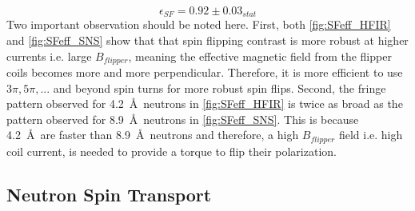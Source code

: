 \begin{equation}
    \epsilon_{SF} = 0.92 \pm 0.03_{stat}
\end{equation}
Two important observation should be noted here. First, both \cref{fig:SFeff_HFIR} and \cref{fig:SFeff_SNS} show that that spin flipping contrast is more robust at higher currents i.e. large $B_{flipper}$, meaning the effective magnetic field from the flipper coils becomes more and more perpendicular. Therefore, it is more efficient to use $3\pi, 5\pi, ...$ and beyond spin turns for more robust spin flips. Second, the fringe pattern observed for 4.2~\AA\ neutrons in \cref{fig:SFeff_HFIR} is twice as broad as the pattern observed for 8.9~\AA\ neutrons in \cref{fig:SFeff_SNS}. This is because 4.2~\AA\ are faster than 8.9~\AA\ neutrons and therefore, a high $B_{flipper}$ field i.e. high coil current, is needed to provide a torque to flip their polarization. 


\subsection{Neutron Spin Transport}

